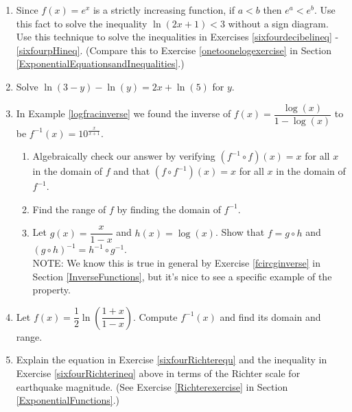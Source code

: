 \documentclass{ximera}
\begin{document}
\begin{enumerate}
\setcounter{enumi}{\value{HW}}

\item \label{onetooneexpexercise} Since $f(x) = e^{x}$ is a strictly increasing function, if $a < b$ then $e^{a} < e^{b}$.  Use this fact to solve the inequality $\ln(2x + 1) < 3$ without a sign diagram. Use this technique to solve the inequalities in Exercises \ref{sixfourdecibelineq} - \ref{sixfourpHineq}. (Compare this to Exercise  \ref{onetoonelogexercise} in Section \ref{ExponentialEquationsandInequalities}.)

\item Solve $\ln(3 - y) - \ln(y) = 2x + \ln(5)$ for $y$.

\item In Example \ref{logfracinverse} we found the inverse of $f(x) = \dfrac{\log(x)}{1-\log(x)}$ to be $f^{-1}(x) = 10^{\frac{x}{x+1}}$.

\begin{enumerate}

\item Algebraically check our answer by verifying  $\left(f^{-1} \circ f\right)(x) = x$ for all $x$ in the domain of $f$ and that $\left(f \circ f^{-1}\right)(x) = x$ for all $x$ in the domain of $f^{-1}$.

\item Find the range of $f$ by finding the domain of $f^{-1}$.

\item Let $g(x) = \dfrac{x}{1 - x}$ and $h(x) = \log(x)$.  Show that $f = g \circ h$ and $(g \circ h)^{-1} = h^{-1} \circ g^{-1}$.\\


NOTE:  We know this is true in general by Exercise \ref{fcircginverse} in Section \ref{InverseFunctions}, but it's nice to see a specific example of the property.

\end{enumerate}

\item \label{inversehyptangent} Let $f(x) = \dfrac{1}{2}\ln\left(\dfrac{1 + x}{1 - x}\right)$.  Compute $f^{-1}(x)$ and find its domain and range.

\item Explain the equation in Exercise \ref{sixfourRichterequ} and the inequality in Exercise \ref{sixfourRichterineq} above in terms of the Richter scale for earthquake magnitude.  (See Exercise \ref{Richterexercise} in Section \ref{ExponentialFunctions}.)


\end{enumerate}
\end{document}
